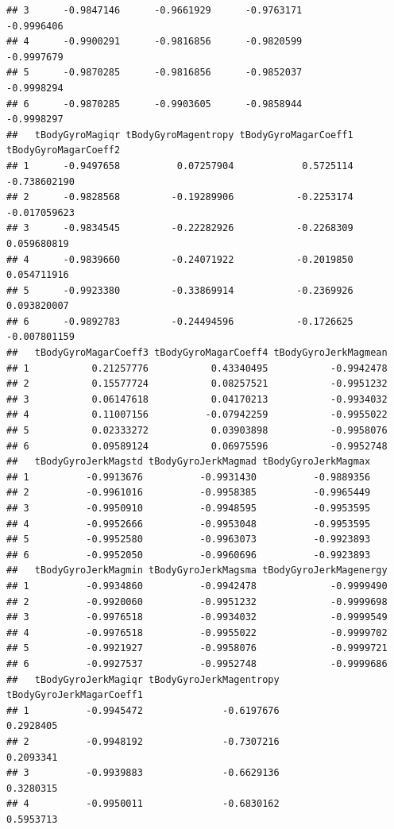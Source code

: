 \documentclass[
]{article}
\begin{document}
\begin{verbatim}
## 3      -0.9847146      -0.9661929      -0.9763171         -0.9996406
## 4      -0.9900291      -0.9816856      -0.9820599         -0.9997679
## 5      -0.9870285      -0.9816856      -0.9852037         -0.9998294
## 6      -0.9870285      -0.9903605      -0.9858944         -0.9998297
##   tBodyGyroMagiqr tBodyGyroMagentropy tBodyGyroMagarCoeff1 tBodyGyroMagarCoeff2
## 1      -0.9497658          0.07257904            0.5725114         -0.738602190
## 2      -0.9828568         -0.19289906           -0.2253174         -0.017059623
## 3      -0.9834545         -0.22282926           -0.2268309          0.059680819
## 4      -0.9839660         -0.24071922           -0.2019850          0.054711916
## 5      -0.9923380         -0.33869914           -0.2369926          0.093820007
## 6      -0.9892783         -0.24494596           -0.1726625         -0.007801159
##   tBodyGyroMagarCoeff3 tBodyGyroMagarCoeff4 tBodyGyroJerkMagmean
## 1           0.21257776           0.43340495           -0.9942478
## 2           0.15577724           0.08257521           -0.9951232
## 3           0.06147618           0.04170213           -0.9934032
## 4           0.11007156          -0.07942259           -0.9955022
## 5           0.02333272           0.03903898           -0.9958076
## 6           0.09589124           0.06975596           -0.9952748
##   tBodyGyroJerkMagstd tBodyGyroJerkMagmad tBodyGyroJerkMagmax
## 1          -0.9913676          -0.9931430          -0.9889356
## 2          -0.9961016          -0.9958385          -0.9965449
## 3          -0.9950910          -0.9948595          -0.9953595
## 4          -0.9952666          -0.9953048          -0.9953595
## 5          -0.9952580          -0.9963073          -0.9923893
## 6          -0.9952050          -0.9960696          -0.9923893
##   tBodyGyroJerkMagmin tBodyGyroJerkMagsma tBodyGyroJerkMagenergy
## 1          -0.9934860          -0.9942478             -0.9999490
## 2          -0.9920060          -0.9951232             -0.9999698
## 3          -0.9976518          -0.9934032             -0.9999549
## 4          -0.9976518          -0.9955022             -0.9999702
## 5          -0.9921927          -0.9958076             -0.9999721
## 6          -0.9927537          -0.9952748             -0.9999686
##   tBodyGyroJerkMagiqr tBodyGyroJerkMagentropy tBodyGyroJerkMagarCoeff1
## 1          -0.9945472              -0.6197676                0.2928405
## 2          -0.9948192              -0.7307216                0.2093341
## 3          -0.9939883              -0.6629136                0.3280315
## 4          -0.9950011              -0.6830162                0.5953713

\end{verbatim}
\end{document}
